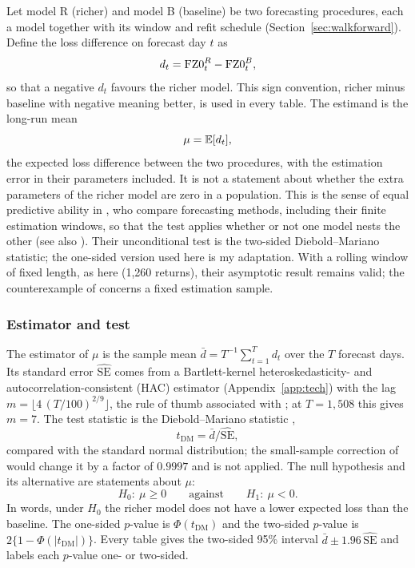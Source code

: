 Let model R (richer) and model B (baseline) be two forecasting procedures, each a model together with its window and refit schedule (Section~\ref{sec:walkforward}). Define the loss difference on forecast day $t$ as
\begin{equation}
d_t=\mathrm{FZ0}_t^{R}-\mathrm{FZ0}_t^{B},
\end{equation}
so that a negative $d_t$ favours the richer model. This sign convention, richer minus baseline with negative meaning better, is used in every table. The estimand is the long-run mean
\begin{equation}
\mu=\mathbb{E}[d_t],
\end{equation}
the expected loss difference between the two procedures, with the estimation error in their parameters included. It is not a statement about whether the extra parameters of the richer model are zero in a population. This is the sense of equal predictive ability in \citet{giacomini2006}, who compare forecasting methods, including their finite estimation windows, so that the test applies whether or not one model nests the other (see also \citealp{diebold2015}). Their unconditional test is the two-sided Diebold--Mariano statistic; the one-sided version used here is my adaptation. With a rolling window of fixed length, as here (1,260 returns), their asymptotic result remains valid; the counterexample of \citet{mccracken2020} concerns a fixed estimation sample.

\subsubsection{Estimator and test}\label{sec:test}

The estimator of $\mu$ is the sample mean $\bar d=T^{-1}\sum_{t=1}^{T}d_t$ over the $T$ forecast days. Its standard error $\widehat{\mathrm{SE}}$ comes from a Bartlett-kernel heteroskedasticity- and autocorrelation-consistent (HAC) estimator (Appendix~\ref{app:tech}) with the lag $m=\lfloor 4\,(T/100)^{2/9}\rfloor$, the rule of thumb associated with \citet{newey1994}; at $T=1{,}508$ this gives $m=7$. The test statistic is the Diebold--Mariano statistic \citep{diebold1995},
\begin{equation}
t_{\mathrm{DM}}=\bar d/\widehat{\mathrm{SE}},
\end{equation}
compared with the standard normal distribution; the small-sample correction of \citet{harvey1997} would change it by a factor of $0.9997$ and is not applied. The null hypothesis and its alternative are statements about $\mu$:
\begin{equation}
H_0:\ \mu\ge 0\qquad\text{against}\qquad H_1:\ \mu<0.
\end{equation}
In words, under $H_0$ the richer model does not have a lower expected loss than the baseline. The one-sided $p$-value is $\Phi(t_{\mathrm{DM}})$ and the two-sided $p$-value is $2\{1-\Phi(|t_{\mathrm{DM}}|)\}$. Every table gives the two-sided 95\% interval $\bar d\pm1.96\,\widehat{\mathrm{SE}}$ and labels each $p$-value one- or two-sided.

